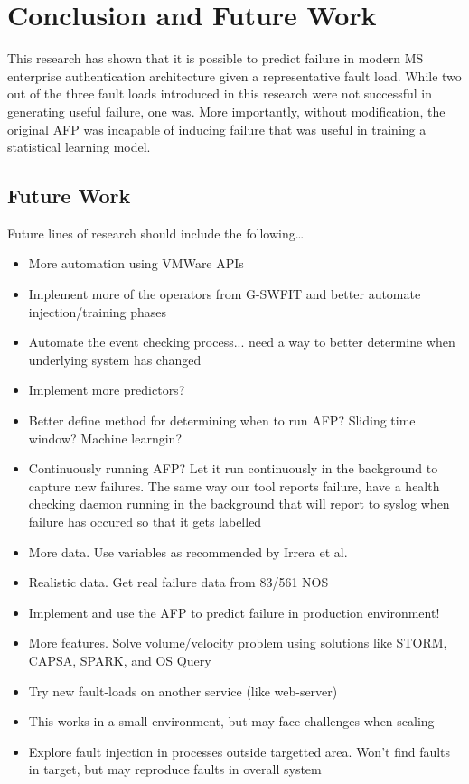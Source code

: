 \chapter{Conclusion and Future Work} \label{chapter5}
This research has shown that it is possible to predict failure in modern
\ac{MS} enterprise authentication architecture given a representative fault
load.  While two out of the three fault loads introduced in this research were
not successful in generating useful failure, one was.  More importantly,
without modification, the original \ac{AFP} was incapable of inducing failure
that was useful in training a statistical learning model.  

\section{Future Work}
Future lines of research should include the following\dots

\begin{itemize}
\item{More automation using VMWare APIs}
\item{Implement more of the operators from G-SWFIT and better automate
injection/training phases}
\item{Automate the event checking process... need a way to better determine
when underlying system has changed}
\item{Implement more predictors?}
\item{Better define method for determining when to run AFP? Sliding time
window?  Machine learngin?}
\item{Continuously running AFP?  Let it run continuously in the background to
capture new failures.  The same way our tool reports failure, have a health
checking daemon running in the background that will report to syslog when
failure has occured so that it gets labelled}
\item{More data.  Use variables as recommended by Irrera et al.}
\item{Realistic data.  Get real failure data from 83/561 NOS}
\item{Implement and use the AFP to predict failure in production environment!}
\item{More features.  Solve volume/velocity problem using solutions like STORM,
CAPSA, SPARK, and OS Query}
\item{Try new fault-loads on another service (like web-server)}
\item{This works in a small environment, but may face challenges when scaling}
\item{Explore fault injection in processes outside targetted area.  Won't find
faults in target, but may reproduce faults in overall system}
\end{itemize}


